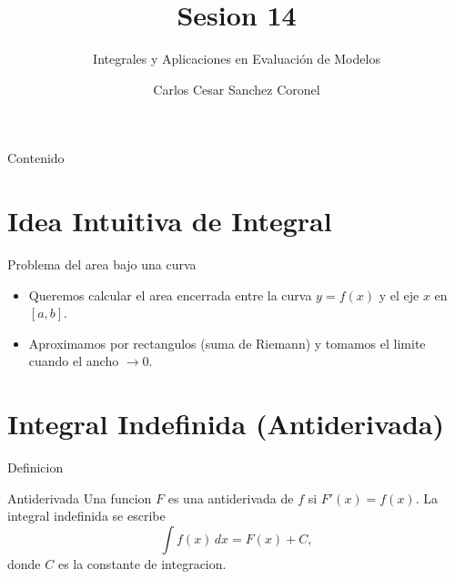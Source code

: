 \documentclass[aspectratio=169, 10pt, xcolor=table]{beamer}
\title[SESION 14 CALCULO]{\textbf{Sesion 14}}
\subtitle{Integrales y Aplicaciones en Evaluación de Modelos}
\author[Prof. C. Sanchez]{Carlos Cesar Sanchez Coronel}
\institute{\textbf{CALCULO Y ALGEBRA LINEAL PARA IA}}
\date{}
\begin{document}
\begin{frame}
    \titlepage
\end{frame}

\begin{frame}{Contenido}
    \tableofcontents
\end{frame}

\section{Idea Intuitiva de Integral}

\begin{frame}{Problema del area bajo una curva}
    \begin{itemize}
        \item Queremos calcular el area encerrada entre la curva $y=f(x)$ y el eje $x$ en $[a,b]$.
        \item Aproximamos por rectangulos (suma de Riemann) y tomamos el limite cuando el ancho $\to 0$.
    \end{itemize}
    \centering
\end{frame}

\section{Integral Indefinida (Antiderivada)}

\begin{frame}{Definicion}
    \begin{block}{Antiderivada}
        Una funcion $F$ es una antiderivada de $f$ si $F'(x)=f(x)$. La integral indefinida se escribe
        \[
        \int f(x)\,dx = F(x) + C,
        \]
        donde $C$ es la constante de integracion.
    \end{block}
\end{frame}
\end{document}
